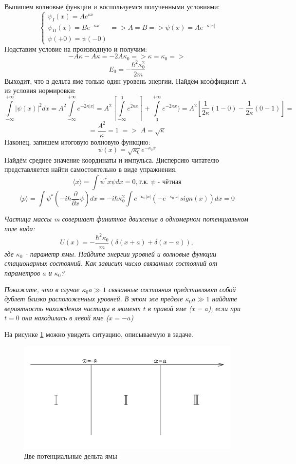 Выпишем волновые функции и воспользуемся полученными условиями:
\[
\begin{cases}
    \psi_I(x) = Ae^{\kappa x}\\
    \psi_{II}(x) = Be^{-\kappa x}\\
    \psi(+0) = \psi(-0)
\end{cases}
=> A = B => \psi(x) = Ae^{-\kappa|x|}
\]
Подставим условие на производную и получим:
\[
-A\kappa - A\kappa = -2A\kappa_0 => \kappa = \kappa_0 => 
\]
\[
E_0 = - \frac{\hbar^2 \kappa_0^2}{2m}
\]
Выходит, что в дельта яме только один уровень энергии. Найдём коэффициент A из условия нормировки:
\[
\int\limits_{-\infty}^{+\infty} |\psi(x)|^2 dx = A^2\int\limits_{-\infty}^{+\infty} e^{-2\kappa |x|} = A^2\left[\int\limits_{-\infty}^0 e^{2\kappa x}\right] + \int\limits_0^{+\infty} e^{-2\kappa x}) = A^2\left[ \frac{1}{2\kappa}(1 - 0) - \frac{1}{2\kappa}(0-1)\right] = 
\]
\[
= \frac{A^2}{\kappa} = 1 \; => \; A = \sqrt{\kappa}
\]
Наконец, запишем итоговую волновую функцию:
\[
\psi(x) = \sqrt{\kappa_0}e^{-\kappa_0 x}
\]
Найдём среднее значение координаты и импульса. Дисперсию читателю представляется найти самостоятельно в виде упражнения.
\[
\langle x \rangle = \int\psi^*x\psi dx = 0, \text{т.к. $\psi$ - чётная}
\]
\[
\langle p \rangle = \int\psi^*(-i\hbar\frac{\partial}{\partial x}\psi) dx = -i\hbar\kappa_0^2\int e^{-\kappa_0|x|}(-e^{-\kappa_0|x|}sign(x)) dx = 0
\]
\begin{center}
    \textit{Частица массы m совершает финитное движение в одномерном потенциальном поле вида:}
    \[
    U(x) = -\frac{\hbar^2\kappa_0}{m}(\delta(x+a) + \delta(x-a)),
    \]
    \textit{где $\kappa_0$ - параметр ямы. Найдите энергии уровней и волновые функции стационарных состояний. Как зависит число связанных состояний от параметров $a$ и $\kappa_0$?}
    
    \textit{Покажите, что в случае $\kappa_0a \gg 1$ связанные состояния представляют собой дублет близко расположенных уровней. В этом же пределе $\kappa_0a\gg1$ найдите вероятность нахождения частицы в момент $t$ в правой яме ($x=a$), если при $t=0$ она находилась в левой яме ($x=-a$)}
\end{center}
На рисунке \ref{fig 4.3} можно увидеть ситуацию, описываемую в задаче.
\begin{figure}[h!]
\centering
\includegraphics[scale=0.27]{class 4/images/two delta hole.png}
\caption{Две потенциальные дельта ямы}
\label{fig 4.3}
\end{figure}

